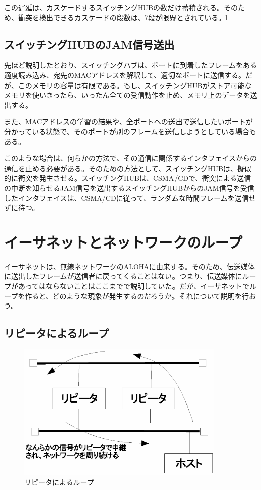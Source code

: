 この遅延は、カスケードするスイッチングHUBの数だけ蓄積される。そのため、衝突を検出できるカスケードの段数は、7段が限界とされている。l

\subsection{スイッチングHUBのJAM信号送出}

先ほど説明したとおり、スイッチングハブは、ポートに到着したフレームをある適度読み込み、宛先のMACアドレスを解釈して、適切なポートに送信する。だが、このメモリの容量は有限である。もし、スイッチングHUBがストア可能なメモリを使いきったら、いったん全ての受信動作を止め、メモリ上のデータを送出する。

また、MACアドレスの学習の結果や、全ポートへの送出で送信したいポートが分かっている状態で、そのポートが別のフレームを送信しようとしている場合もある。

このような場合は、何らかの方法で、その通信に関係するインタフェイスからの通信を止める必要がある。そのための方法として、スイッチングHUBは、擬似的に衝突を発生させる。スイッチングHUBは、CSMA/CDで、衝突による送信の中断を知らせるJAM信号を送出するスイッチングHUBからのJAM信号を受信したインタフェイスは、CSMA/CDに従って、ランダムな時間フレームを送信せずに待つ。

\section{イーサネットとネットワークのループ}

イーサネットは、無線ネットワークのALOHAに由来する。そのため、伝送媒体に送出したフレームが送信者に戻ってくることはない。つまり、伝送媒体にループがあってはならないことはここまでで説明していた。だが、イーサネットでループを作ると、どのような現象が発生するのだろうか。それについて説明を行おう。


\subsection{リピータによるループ}


\begin{figure}[htbp]
	\includegraphics[width=10cm,clip]{draw/repeaterloop.eps}
	\caption{リピータによるループ}
	\label{fig:repeaterloop}
\end{figure}

